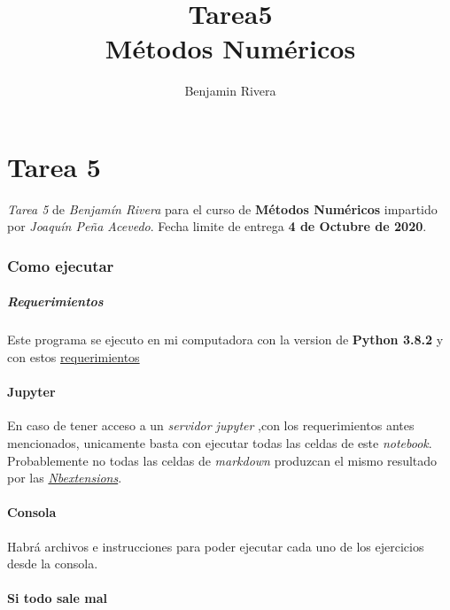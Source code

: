 \documentclass[11pt]{article}
\title{Tarea5\\M\'etodos Num\'ericos}
\author{Benjamin Rivera}
\begin{document}
    
    \maketitle
    \tableofcontents
    
    

\newpage
    \hypertarget{tarea-5}{%
\section{Tarea 5}\label{tarea-5}}

\emph{Tarea 5} de \emph{Benjamín Rivera} para el curso de
\textbf{Métodos Numéricos} impartido por \emph{Joaquín Peña Acevedo}.
Fecha limite de entrega \textbf{4 de Octubre de 2020}.

    \hypertarget{como-ejecutar}{%
\subsubsection{Como ejecutar}\label{como-ejecutar}}

    \hypertarget{requerimientos}{%
\subparagraph{Requerimientos}\label{requerimientos}}

Este programa se ejecuto en mi computadora con la version de
\textbf{Python 3.8.2} y con estos
\href{https://github.com/BenchHPZ/UG-Compu/blob/master/MN/requerimientos.txt}{requerimientos}

\hypertarget{jupyter}{%
\paragraph{Jupyter}\label{jupyter}}

En caso de tener acceso a un \emph{servidor jupyter} ,con los
requerimientos antes mencionados, unicamente basta con ejecutar todas
las celdas de este \emph{notebook}. Probablemente no todas las celdas de
\emph{markdown} produzcan el mismo resultado por las
\href{jupyter-contrib-nbextensions.readthedocs.io}{\emph{Nbextensions}}.

\hypertarget{consola}{%
\paragraph{Consola}\label{consola}}

Habrá archivos e instrucciones para poder ejecutar cada uno de los
ejercicios desde la consola.

\hypertarget{si-todo-sale-mal}{%
\paragraph{Si todo sale mal}\label{si-todo-sale-mal}}
\end{document}

